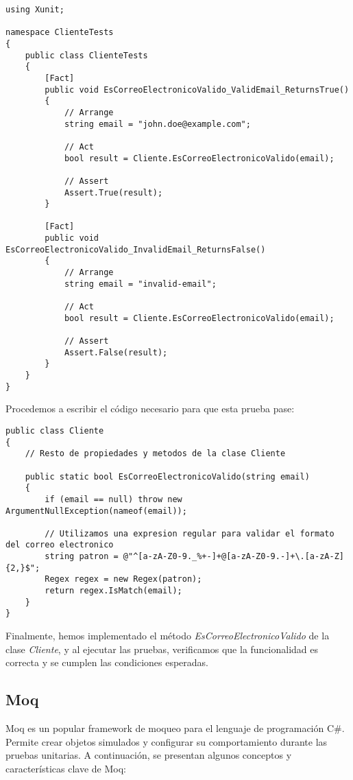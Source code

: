 \documentclass[executivepaper]{article}
\begin{document}
\begin{lstlisting}
using Xunit;

namespace ClienteTests
{
    public class ClienteTests
    {
        [Fact]
        public void EsCorreoElectronicoValido_ValidEmail_ReturnsTrue()
        {
            // Arrange
            string email = "john.doe@example.com";

            // Act
            bool result = Cliente.EsCorreoElectronicoValido(email);

            // Assert
            Assert.True(result);
        }

        [Fact]
        public void EsCorreoElectronicoValido_InvalidEmail_ReturnsFalse()
        {
            // Arrange
            string email = "invalid-email";

            // Act
            bool result = Cliente.EsCorreoElectronicoValido(email);

            // Assert
            Assert.False(result);
        }
    }
}
\end{lstlisting}

Procedemos a escribir el código necesario para que esta prueba pase:

\begin{lstlisting}
public class Cliente
{
    // Resto de propiedades y metodos de la clase Cliente

    public static bool EsCorreoElectronicoValido(string email)
    {
        if (email == null) throw new ArgumentNullException(nameof(email));
        
        // Utilizamos una expresion regular para validar el formato del correo electronico
        string patron = @"^[a-zA-Z0-9._%+-]+@[a-zA-Z0-9.-]+\.[a-zA-Z]{2,}$";
        Regex regex = new Regex(patron);
        return regex.IsMatch(email);
    }
}
\end{lstlisting}

Finalmente, hemos implementado el método \emph{EsCorreoElectronicoValido} de la clase \emph{Cliente}, y al ejecutar las pruebas, verificamos que la funcionalidad es correcta y se cumplen las condiciones esperadas.

\subsection{Moq}
Moq es un popular framework de moqueo para el lenguaje de programación C\#. Permite crear objetos simulados y configurar su comportamiento durante las pruebas unitarias. A continuación, se presentan algunos conceptos y características clave de Moq:
\end{document}
